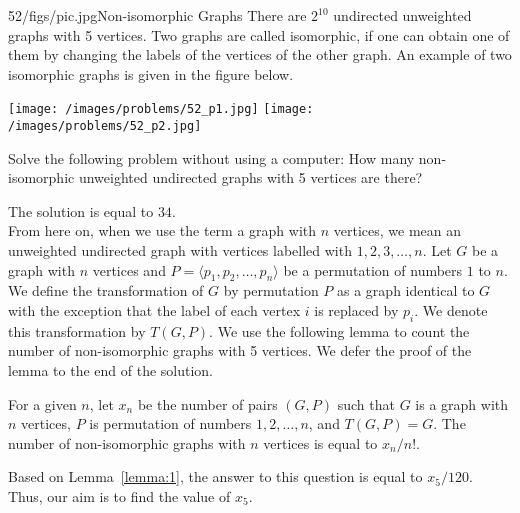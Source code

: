 \begin{problem}{52/figs/pic.jpg}{Non-isomorphic Graphs}  There are $2^{10}$ undirected unweighted graphs with 5 vertices. Two graphs are called isomorphic, if one can obtain one of them by changing the labels of the vertices of the other graph. An example of two isomorphic graphs is given in the figure below.

\begin{center}
	\texttt{[image: /images/problems/52\_p1.jpg]}	\texttt{[image: /images/problems/52\_p2.jpg]}
\end{center}	

Solve the following problem without using a computer: How many non-isomorphic unweighted undirected graphs with 5 vertices are there?
\end{problem}
\begin{solution}
The solution is equal to $34$.\\[0.2cm]

From here on, when we use the term a graph with $n$ vertices, we mean an unweighted undirected graph with vertices labelled with $1, 2, 3, \ldots, n$. Let $G$ be a graph with $n$ vertices and $P = \langle p_1, p_2, \ldots, p_n \rangle$ be a permutation of numbers $1$ to $n$. We define the transformation of $G$ by permutation $P$ as a graph identical to $G$ with the exception that the label of each vertex $i$ is replaced by $p_i$. We denote this transformation by $T(G, P)$.
We use the following lemma to count the number of non-isomorphic graphs with 5 vertices. We defer the proof of the lemma to the end of the solution.
\begin{lemma}\label{lemma:1}
	For a given $n$, let $x_n$ be the number of pairs $(G, P)$ such that $G$ is a graph with $n$ vertices, $P$ is  permutation of numbers $1,2, \ldots, n$, and $T(G, P) = G$. The number of non-isomorphic graphs with $n$ vertices is equal to $x_n/n!$.
\end{lemma}


Based on Lemma~\ref{lemma:1}, the answer to this question is equal to $x_5 / 120$. Thus, our aim is to find the value of $x_5$.\\[0.2cm]


\end{solution}
